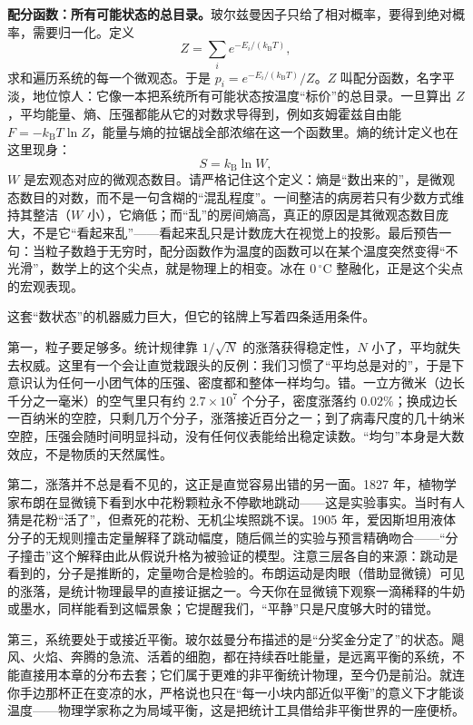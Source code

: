 \begin{challenge}
\textbf{配分函数：所有可能状态的总目录。}玻尔兹曼因子只给了相对概率，要得到绝对概率，需要归一化。定义
\[
Z = \sum_i e^{-E_i/(k_{\mathrm B} T)},
\]
求和遍历系统的每一个微观态。于是 \(p_i = e^{-E_i/(k_{\mathrm B}T)}/Z\)。\(Z\) 叫配分函数，名字平淡，地位惊人：它像一本把系统所有可能状态按温度“标价”的总目录。一旦算出 \(Z\)，平均能量、熵、压强都能从它的对数求导得到，例如亥姆霍兹自由能 \(F = -k_{\mathrm B}T\ln Z\)，能量与熵的拉锯战全部浓缩在这一个函数里。熵的统计定义也在这里现身：
\[
S = k_{\mathrm B}\ln W,
\]
\(W\) 是宏观态对应的微观态数目。请严格记住这个定义：熵是“数出来的”，是微观态数目的对数，而不是一句含糊的“混乱程度”。一间整洁的病房若只有少数方式维持其整洁（\(W\) 小），它熵低；而“乱”的房间熵高，真正的原因是其微观态数目庞大，不是它“看起来乱”——看起来乱只是计数庞大在视觉上的投影。最后预告一句：当粒子数趋于无穷时，配分函数作为温度的函数可以在某个温度突然变得“不光滑”，数学上的这个尖点，就是物理上的相变。冰在 \(0\,^\circ\mathrm{C}\) 整融化，正是这个尖点的宏观表现。
\end{challenge}


这套“数状态”的机器威力巨大，但它的铭牌上写着四条适用条件。

第一，粒子要足够多。统计规律靠 \(1/\sqrt{N}\) 的涨落获得稳定性，\(N\) 小了，平均就失去权威。这里有一个会让直觉栽跟头的反例：我们习惯了“平均总是对的”，于是下意识认为任何一小团气体的压强、密度都和整体一样均匀。错。一立方微米（边长千分之一毫米）的空气里只有约 \(2.7\times10^{7}\) 个分子，密度涨落约 \(0.02\%\)；换成边长一百纳米的空腔，只剩几万个分子，涨落接近百分之一；到了病毒尺度的几十纳米空腔，压强会随时间明显抖动，没有任何仪表能给出稳定读数。“均匀”本身是大数效应，不是物质的天然属性。

第二，涨落并不总是看不见的，这正是直觉容易出错的另一面。1827 年，植物学家布朗在显微镜下看到水中花粉颗粒永不停歇地跳动——这是实验事实。当时有人猜是花粉“活了”，但煮死的花粉、无机尘埃照跳不误。1905 年，爱因斯坦用液体分子的无规则撞击定量解释了跳动幅度，随后佩兰的实验与预言精确吻合——“分子撞击”这个解释由此从假说升格为被验证的模型。注意三层各自的来源：跳动是看到的，分子是推断的，定量吻合是检验的。布朗运动是肉眼（借助显微镜）可见的涨落，是统计物理最早的直接证据之一。今天你在显微镜下观察一滴稀释的牛奶或墨水，同样能看到这幅景象；它提醒我们，“平静”只是尺度够大时的错觉。

第三，系统要处于或接近平衡。玻尔兹曼分布描述的是“分奖金分定了”的状态。飓风、火焰、奔腾的急流、活着的细胞，都在持续吞吐能量，是远离平衡的系统，不能直接用本章的分布去套；它们属于更难的非平衡统计物理，至今仍是前沿。就连你手边那杯正在变凉的水，严格说也只在“每一小块内部近似平衡”的意义下才能谈温度——物理学家称之为局域平衡，这是把统计工具借给非平衡世界的一座便桥。

